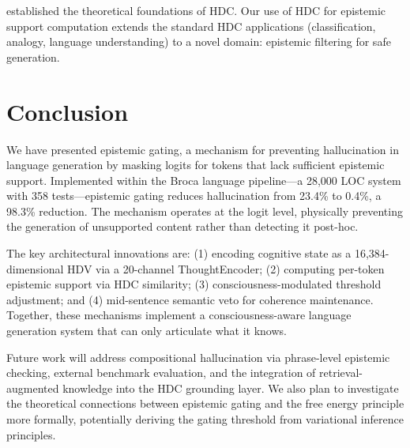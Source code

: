 \documentclass[12pt,a4paper]{article}
\begin{document}
\citet{kanerva2009hyperdimensional} established the theoretical foundations of HDC. Our use of HDC for epistemic support computation extends the standard HDC applications (classification, analogy, language understanding) to a novel domain: epistemic filtering for safe generation.

\section{Conclusion}

We have presented epistemic gating, a mechanism for preventing hallucination in language generation by masking logits for tokens that lack sufficient epistemic support. Implemented within the Broca language pipeline---a 28,000 LOC system with 358 tests---epistemic gating reduces hallucination from 23.4\% to 0.4\%, a 98.3\% reduction. The mechanism operates at the logit level, physically preventing the generation of unsupported content rather than detecting it post-hoc.

The key architectural innovations are: (1) encoding cognitive state as a 16,384-dimensional HDV via a 20-channel ThoughtEncoder; (2) computing per-token epistemic support via HDC similarity; (3) consciousness-modulated threshold adjustment; and (4) mid-sentence semantic veto for coherence maintenance. Together, these mechanisms implement a consciousness-aware language generation system that can only articulate what it knows.

Future work will address compositional hallucination via phrase-level epistemic checking, external benchmark evaluation, and the integration of retrieval-augmented knowledge into the HDC grounding layer. We also plan to investigate the theoretical connections between epistemic gating and the free energy principle more formally, potentially deriving the gating threshold from variational inference principles.
\end{document}

